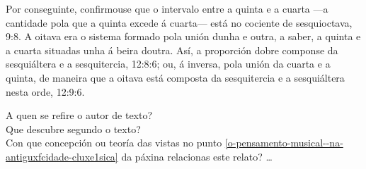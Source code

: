 \begin{multicols}{3}
{\noindent
Por conseguinte, confirmouse que o intervalo entre a quinta e a cuarta ---a cantidade pola que a quinta excede á cuarta--- está no cociente de sesquioctava, 9:8. A oitava era o sistema formado pola unión dunha e outra, a saber, a quinta e a cuarta situadas unha á beira doutra. Así, a proporción dobre componse da sesquiáltera e a sesquitercia, 12:8:6; ou, á inversa, pola unión da cuarta e a quinta, de maneira que a oitava está composta da sesquitercia e a sesquiáltera nesta orde, 12:9:6.
}

\end{multicols}


\begin{ejercicio}[]
A quen se refire o autor de texto? \dotfill \\
Que descubre segundo o texto?\dotfill \\
Con que concepción ou teoría das vistas no punto \ref{o-pensamento-musical--na-antiguxfcidade-cluxe1sica} da páxina \pageref{o-pensamento-musical--na-antiguxfcidade-cluxe1sica} relacionas este relato? \ldots
 \vspace*{1.0cm} %
\end{ejercicio}
%
%
